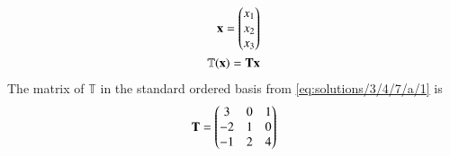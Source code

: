 
\begin{align}
   \mathbf{x}=\begin{pmatrix}x_1\\x_2\\x_3\end{pmatrix}\\
   \mathbb{T}(\mathbf{x})=\mathbf{T}\mathbf{x}
   \end{align}
The matrix of $\mathbb{T}$ in the standard ordered basis from \eqref{eq:solutions/3/4/7/a/1} is 
 \begin{align}   
   \mathbf{T}=\begin{pmatrix}3&0&1\\-2&1&0\\-1&2&4\end{pmatrix}
\end{align}

